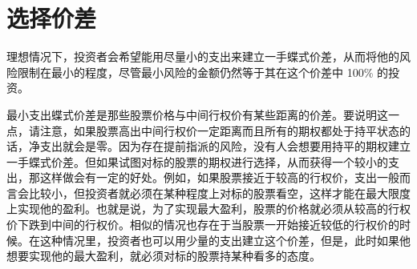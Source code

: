 \section{选择价差}
理想情况下，投资者会希望能用尽量小的支出来建立一手蝶式价差，从而将他的风险限制在最小的程度，尽管最小风险的金额仍然等于其在这个价差中 100\% 的投资。

最小支出蝶式价差是那些股票价格与中间行权价有某些距离的价差。要说明这一点，请注意，如果股票高出中间行权价一定距离而且所有的期权都处于持平状态的话，净支出就会是零。因为存在提前指派的风险，没有人会想要用持平的期权建立一手蝶式价差。但如果试图对标的股票的期权进行选择，从而获得一个较小的支出，那这样做会有一定的好处。例如，如果股票接近于较高的行权价，支出一般而言会比较小，但投资者就必须在某种程度上对标的股票看空，这样才能在最大限度上实现他的盈利。也就是说，为了实现最大盈利，股票的价格就必须从较高的行权价下跌到中间的行权价。相似的情况也存在于当股票一开始接近较低的行权价的时候。在这种情况里，投资者也可以用少量的支出建立这个价差，但是，此时如果他想要实现他的最大盈利，就必须对标的股票持某种看多的态度。

